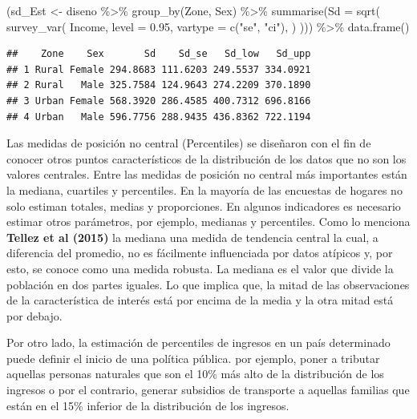\documentclass[
  12pt,
]{book}
\newenvironment{Shaded}{\begin{snugshade}}{\end{snugshade}}
\newcommand{\AttributeTok}[1]{\textcolor[rgb]{0.77,0.63,0.00}{#1}}
\newcommand{\FloatTok}[1]{\textcolor[rgb]{0.00,0.00,0.81}{#1}}
\newcommand{\FunctionTok}[1]{\textcolor[rgb]{0.00,0.00,0.00}{#1}}
\newcommand{\NormalTok}[1]{#1}
\newcommand{\OtherTok}[1]{\textcolor[rgb]{0.56,0.35,0.01}{#1}}
\newcommand{\SpecialCharTok}[1]{\textcolor[rgb]{0.00,0.00,0.00}{#1}}
\newcommand{\StringTok}[1]{\textcolor[rgb]{0.31,0.60,0.02}{#1}}
\begin{document}
\begin{Shaded}
\begin{Highlighting}[]
\NormalTok{(sd\_Est }\OtherTok{\textless{}{-}}\NormalTok{ diseno }\SpecialCharTok{\%\textgreater{}\%} \FunctionTok{group\_by}\NormalTok{(Zone, Sex) }\SpecialCharTok{\%\textgreater{}\%} 
   \FunctionTok{summarise}\NormalTok{(}\AttributeTok{Sd =} \FunctionTok{sqrt}\NormalTok{(}
  \FunctionTok{survey\_var}\NormalTok{(}
\NormalTok{    Income,}
    \AttributeTok{level =} \FloatTok{0.95}\NormalTok{,}
    \AttributeTok{vartype =}  \FunctionTok{c}\NormalTok{(}\StringTok{"se"}\NormalTok{, }\StringTok{"ci"}\NormalTok{),}
\NormalTok{   )}
\NormalTok{))) }\SpecialCharTok{\%\textgreater{}\%} \FunctionTok{data.frame}\NormalTok{()}
\end{Highlighting}
\end{Shaded}

\begin{verbatim}
##    Zone    Sex       Sd    Sd_se   Sd_low   Sd_upp
## 1 Rural Female 294.8683 111.6203 249.5537 334.0921
## 2 Rural   Male 325.7584 124.9643 274.2209 370.1890
## 3 Urban Female 568.3920 286.4585 400.7312 696.8166
## 4 Urban   Male 596.7756 288.9435 436.8362 722.1194
\end{verbatim}

Las medidas de posición no central (Percentiles) se diseñaron con el fin de conocer otros puntos característicos de la distribución de los datos que no son los valores centrales. Entre las medidas de posición no central más importantes están la mediana, cuartiles y percentiles. En la mayoría de las encuestas de hogares no solo estiman totales, medias y proporciones. En algunos indicadores es necesario estimar otros parámetros, por ejemplo, medianas y percentiles. Como lo menciona \textbf{Tellez et al (2015)} la mediana una medida de tendencia central la cual, a diferencia del promedio, no es fácilmente influenciada por datos atípicos y, por esto, se conoce como una medida robusta. La mediana es el valor que divide la población en dos partes iguales. Lo que implica que, la mitad de las observaciones de la característica de interés está por encima de la media y la otra mitad está por debajo.

Por otro lado, la estimación de percentiles de ingresos en un país determinado puede definir el inicio de una política pública. por ejemplo, poner a tributar aquellas personas naturales que son el 10\% más alto de la distribución de los ingresos o por el contrario, generar subsidios de transporte a aquellas familias que están en el 15\% inferior de la distribución de los ingresos.
\end{document}

